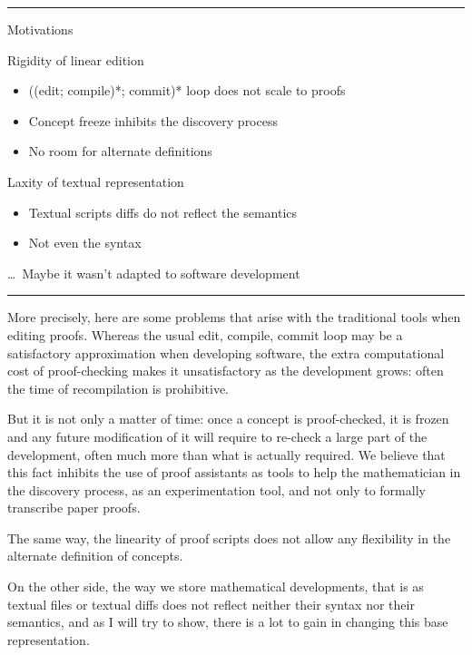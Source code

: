 \documentclass[12pt]{article} \usepackage{beamerarticle} \usepackage{fullpage}
\begin{document}
\hrule
\begin{frame}{Motivations}
  \begin{block}{Rigidity of linear edition}
    \begin{itemize}
    \item ((edit; compile)*; commit)* loop does not scale to proofs
    \item Concept freeze inhibits the discovery process
    \item No room for alternate definitions
    \end{itemize}
  \end{block}
  \pause
  \begin{block}{Laxity of textual representation}
    \begin{itemize}
    \item Textual scripts \textsf{diff}s do not reflect the semantics
    \item Not even the syntax
    \end{itemize}
  \end{block}
  \vspace{2em}
  \pause
  {\tiny \ldots\ Maybe it wasn't adapted to software development}
\end{frame}
\hrule

More precisely, here are some problems that arise with the traditional
tools when editing proofs. Whereas the usual edit, compile, commit
loop may be a satisfactory approximation when developing software, the
extra computational cost of proof-checking makes it unsatisfactory as
the development grows: often the time of recompilation is prohibitive.

But it is not only a matter of time: once a concept is proof-checked,
it is frozen and any future modification of it will require to
re-check a large part of the development, often much more than what is
actually required. We believe that this fact inhibits the use of proof
assistants as tools to help the mathematician in the discovery
process, as an experimentation tool, and not only to formally
transcribe paper proofs.

The same way, the linearity of proof scripts does not allow any
flexibility in the alternate definition of concepts.

On the other side, the way we store mathematical developments, that is
as textual files or textual diffs does not reflect neither their
syntax nor their semantics, and as I will try to show, there is a lot
to gain in changing this base representation.
\end{document}

